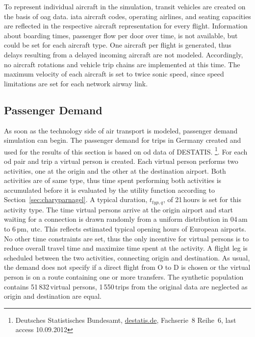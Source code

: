 To represent individual aircraft in the simulation, transit vehicles are created on the basis of \gls{oag} data. 
\gls{iata} aircraft codes, operating airlines, and seating capacities are reflected in the respective aircraft representation for every flight. 
Information about boarding times, \ie passenger flow per door over time, is not available, but could be set for each aircraft type. 
One aircraft per flight is generated, thus delays resulting from a delayed incoming aircraft are not modeled.
Accordingly, no aircraft rotations and vehicle trip chains are implemented at this time. 
The maximum velocity of each aircraft is set to twice sonic speed, since speed limitations are set for each network airway link. 

\subsection{Passenger Demand}
As soon as the technology side of air transport is modeled, passenger demand simulation can begin. 
The passenger demand for trips in Germany created and used for the results of this section is based on \gls{od} data of DESTATIS.%
\footnote{Deutsches Statistisches Bundesamt, \url{destatis.de}, Fachserie~8 Reihe~6, last access 10.09.2012}.
% 
For each \gls{od} pair and trip a virtual person is created.
Each virtual person performs two activities, one at the origin and the other at the destination airport. 
Both activities are of same type, thus time spent performing both activities is accumulated before it is evaluated by the utility function according to Section~\ref{sec:charyparnagel}. %
A typical duration, $t_{typ,q}$, of 21\,hours is set for this activity type. 
The time virtual persons arrive at the origin airport and start waiting for a connection is drawn randomly from a uniform distribution in 04\,am to 6\,pm, \gls{utc}. 
This reflects estimated typical opening hours of European airports.
No other time constraints are set, thus the only incentive for virtual persons is to reduce overall travel time and maximize time spent at the activity. 
A flight leg is scheduled between the two activities, connecting origin and destination.
As usual, the demand does not specify if a direct flight from O to D is chosen or the virtual person is on a route containing one or more transfers.
The synthetic population contains 51\,832\,virtual persons, 1\,550\,trips from the original data are neglected as origin and destination are equal.

